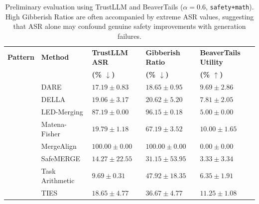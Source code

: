 \begin{table}[t]
\caption{Preliminary evaluation using TrustLLM and BeaverTails ($\alpha=0.6$, \texttt{safety+math}). High Gibberish Ratios are often accompanied by extreme ASR values, suggesting that ASR alone may confound genuine safety improvements with generation failures.}
\label{tab:prelim_detail}
\centering
\small
\setlength{\tabcolsep}{3pt}
\renewcommand{\arraystretch}{1.08}
\begin{tabularx}{\textwidth}{
>{\raggedright\arraybackslash}p{2.45cm}
>{\raggedright\arraybackslash}p{2.10cm}
>{\centering\arraybackslash}X
>{\centering\arraybackslash}X
>{\centering\arraybackslash}X
}
\toprule
\textbf{Pattern} &
\textbf{Method} &
\textbf{TrustLLM ASR} &
\textbf{Gibberish Ratio} &
\textbf{BeaverTails Utility} \\
&
&
\textbf{(\% $\downarrow$)} &
\textbf{(\% $\downarrow$)} &
\textbf{(\% $\uparrow$)} \\
\midrule

\multirow{9}{*}{safety+math}
& DARE            & $17.19 \pm 0.83$  & $18.65 \pm 0.95$  & $9.69 \pm 2.86$ \\
& DELLA           & $19.06 \pm 3.17$  & $20.62 \pm 5.20$  & $7.81 \pm 2.05$ \\
& LED-Merging     & $87.19 \pm 0.00$  & $96.15 \pm 0.18$  & $5.00 \pm 0.00$ \\
& Matena-Fisher   & $19.79 \pm 1.18$  & $67.19 \pm 3.52$  & $10.00 \pm 1.65$ \\
& MergeAlign      & $100.00 \pm 0.00$ & $100.00 \pm 0.00$ & $0.00 \pm 0.00$ \\
& SafeMERGE       & $14.27 \pm 22.55$ & $31.15 \pm 53.95$ & $3.33 \pm 3.34$ \\
& Task Arithmetic & $9.69 \pm 0.31$   & $47.92 \pm 18.35$ & $6.35 \pm 1.91$ \\
& TIES            & $18.65 \pm 4.77$  & $36.67 \pm 4.77$  & $11.25 \pm 1.08$ \\
\bottomrule
\end{tabularx}
\end{table}